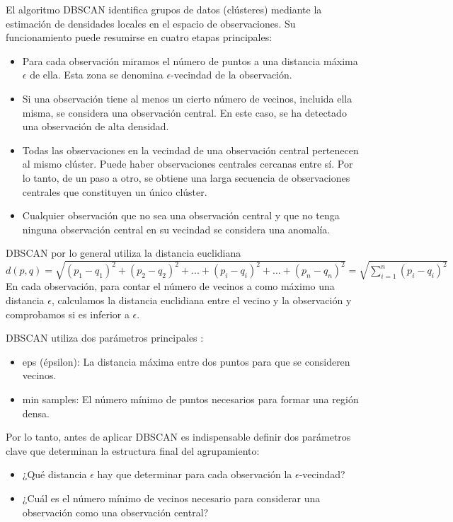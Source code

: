 \documentclass{article}
\begin{document}
El algoritmo DBSCAN identifica grupos de datos (clústeres) mediante la estimación de densidades locales en el espacio de observaciones. Su funcionamiento puede resumirse en cuatro etapas principales:
\begin{itemize}
  \item Para cada observación miramos el número de puntos a una distancia máxima $\epsilon$ de ella. Esta zona se denomina $\epsilon$-vecindad de la observación.
  \item Si una observación tiene al menos un cierto número de vecinos, incluida ella misma, se considera una observación central. En este caso, se ha detectado una observación de alta densidad.
  \item Todas las observaciones en la vecindad de una observación central pertenecen al mismo clúster. Puede haber observaciones centrales cercanas entre sí. Por lo tanto, de un paso a otro, se obtiene una larga secuencia de observaciones centrales que constituyen un único clúster.
  \item Cualquier observación que no sea una observación central y que no tenga ninguna observación central en su vecindad se considera una anomalía.
\end{itemize}

DBSCAN por lo general utiliza la distancia euclidiana\\

\begin{math}
d(p,q)=\sqrt{(p_1-q_1)^2+(p_2-q_2)^2+...+(p_i-q_i)^2+...+(p_n-q_n)^2}=\sqrt{\sum_{i=1}^{n} (p_i-q_i)^2}
\end{math}\\

En cada observación, para contar el número de vecinos a como máximo una distancia $\epsilon$, calculamos la distancia euclidiana entre el vecino y la observación y comprobamos si es inferior a $\epsilon$.

DBSCAN utiliza dos parámetros principales \cite{datacamp}:
\begin{itemize}
    \item eps (épsilon): La distancia máxima entre dos puntos para que se consideren vecinos.
    \item min samples: El número mínimo de puntos necesarios para formar una región densa.
\end{itemize}

Por lo tanto, antes de aplicar DBSCAN es indispensable definir dos parámetros clave que determinan la estructura final del agrupamiento:
\begin{itemize}
\item ¿Qué distancia $\epsilon$ hay que determinar para cada observación la $\epsilon$-vecindad? 
\item ¿Cuál es el número mínimo de vecinos necesario para considerar una observación como una observación central?
\end{itemize}
\end{document}
